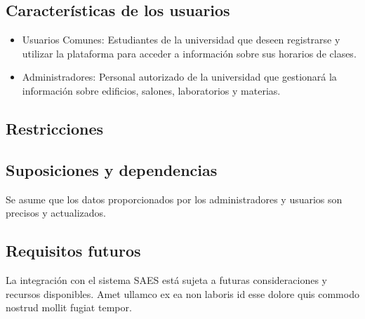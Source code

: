 \subsection{Características de los usuarios}
\begin{itemize}
        \item Usuarios Comunes: Estudiantes de la universidad que deseen registrarse y utilizar la plataforma para acceder a información sobre sus horarios de clases.
        \item Administradores: Personal autorizado de la universidad que gestionará la información sobre edificios, salones, laboratorios y materias.
\end{itemize}

\subsection{Restricciones}

\subsection{Suposiciones y dependencias}
Se asume que los datos proporcionados por los administradores y usuarios son precisos y actualizados.

\subsection{Requisitos futuros}
La integración con el sistema SAES está sujeta a futuras consideraciones y recursos disponibles.
Amet ullamco ex ea non laboris id esse dolore quis commodo nostrud mollit fugiat tempor.